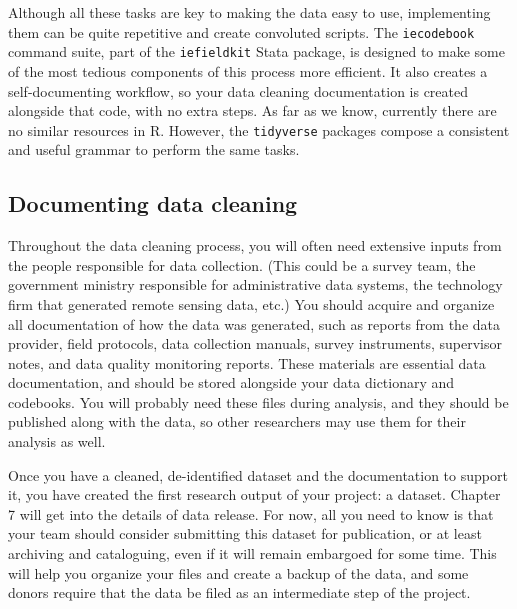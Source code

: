 Although all these tasks are key to making the data easy to use,
implementing them can be quite repetitive and create convoluted scripts.
The \texttt{iecodebook} command suite, part of the \texttt{iefieldkit} Stata package,
is designed to make some of the most tedious components of this process more efficient.
It also creates a self-documenting workflow,
so your data cleaning documentation is created alongside that code,
with no extra steps.
As far as we know, currently there are no similar resources in R.
However, the \texttt{tidyverse} packages
compose a consistent and useful grammar to perform the same tasks.


\subsection{Documenting data cleaning}
Throughout the data cleaning process,
you will often need extensive inputs from the people responsible for data collection.
(This could be a survey team, the government ministry responsible for administrative data systems,
the technology firm that generated remote sensing data, etc.)
You should acquire and organize all documentation of how the data was generated, such as
reports from the data provider, field protocols, data collection manuals, survey instruments,
supervisor notes, and data quality monitoring reports.
These materials are essential data documentation,
and should be stored alongside your data dictionary and codebooks.
You will probably need these files during analysis,
and they should be published along with the data,
so other researchers may use them for their analysis as well.

Once you have a cleaned, de-identified dataset and the documentation to support it,
you have created the first research output of your project: a dataset.
Chapter 7 will get into the details of data release.
For now, all you need to know is that your team 
should consider submitting this dataset for publication,
or at least archiving and cataloguing,
even if it will remain embargoed for some time.
This will help you organize your files and create a backup of the data,
and some donors require that the data be filed as an intermediate step of the project.

